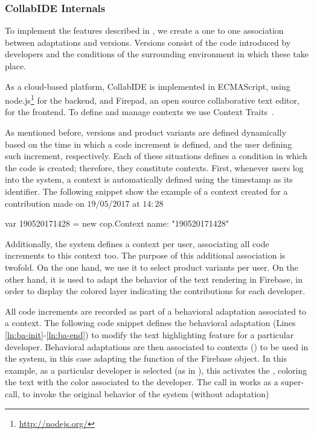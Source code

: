 \subsubsection{CollabIDE Internals}
To implement the features described in , we create a one to one association 
between adaptations and versions.
Versions consist of the code introduced by developers and the conditions of the surrounding 
environment in which these take place. 

As a cloud-based platform, CollabIDE is implemented in ECMAScript, using 
node.js\footnote{\url{http://nodejs.org/}} for the backend, and 
Firepad, an open source collaborative text editor, for the frontend.
To define and manage contexts we use Context Traits~\cite{gonzalez13}. 

As mentioned before, versions and product variants are defined dynamically based on the time in 
which a code increment is defined, and the user defining such increment, respectively. Each of 
these situations defines a condition in which the code is created; therefore, they constitute contexts.
First, whenever users log into the system, a context is automatically defined
using the timestamp as its identifier. The following snippet show the example of a context created 
for a contribution made on $19/05/2017$ at $14:28$
\vspace{-4ex}
\begin{ctxtraits}
 var 190520171428 = new cop.Context{
   name: "190520171428"
 }
\end{ctxtraits}
\vspace{-4ex}

Additionally, the system defines a context per user, associating all code increments to this context too. 
The purpose of this additional association is twofold. On the one hand, we use it to select product 
variants per user. On the other hand, it is used to adapt the behavior of the text rendering 
in Firebase, in order to display the colored layer indicating the contributions for each developer.

All code increments are recorded as part of a behavioral adaptation associated to a context. The 
following code snippet defines the behavioral adaptation (Lines \ref{ln:ba-init}-\ref{ln:ba-end}) to modify 
the text highlighting feature for a particular developer. Behavioral adaptations are then
associated to contexts () to be used in the system, in this case adapting the 
 function of the  Firebase object. In this example, as a 
particular developer is selected (as in ), this activates the , 
coloring the text with the color associated to the developer. The  call in  
works as a super-call, to invoke the original behavior of the system (\ie without adaptation)

